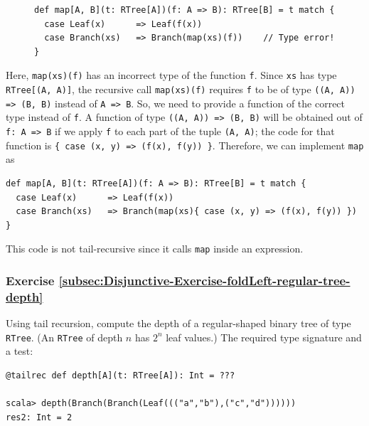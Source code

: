 \begin{figure}%
\vspace{-0.5\baselineskip}

\begin{lstlisting}
def map[A, B](t: RTree[A])(f: A => B): RTree[B] = t match {
  case Leaf(x)      => Leaf(f(x))
  case Branch(xs)   => Branch(map(xs)(f))    // Type error!
}
\end{lstlisting}
\vspace{-0.75\baselineskip}
\end{figure}%

\noindent Here, \lstinline!map(xs)(f)! has an incorrect type of the
function \lstinline!f!. Since \lstinline!xs! has type \lstinline!RTree[(A, A)]!,
the recursive call \lstinline!map(xs)(f)! requires \lstinline!f!
to be of type \lstinline!((A, A)) => (B, B)! instead of \lstinline!A => B!.
So, we need to provide a function of the correct type instead of \lstinline!f!.
A function of type \lstinline!((A, A)) => (B, B)! will be obtained
out of \lstinline!f: A => B! if we apply \lstinline!f! to each part
of the tuple \lstinline!(A, A)!; the code for that function is \lstinline!{ case (x, y) => (f(x), f(y)) }!.
Therefore, we can implement \lstinline!map! as
\begin{lstlisting}
def map[A, B](t: RTree[A])(f: A => B): RTree[B] = t match {
  case Leaf(x)      => Leaf(f(x))
  case Branch(xs)   => Branch(map(xs){ case (x, y) => (f(x), f(y)) })
}
\end{lstlisting}
This code is not tail-recursive since it calls \lstinline!map! inside
an expression.

\subsubsection{Exercise \label{subsec:Disjunctive-Exercise-foldLeft-regular-tree-depth}\ref{subsec:Disjunctive-Exercise-foldLeft-regular-tree-depth}}

Using tail recursion, compute the depth of a regular-shaped binary
tree of type \lstinline!RTree!. (An \lstinline!RTree! of depth $n$
has $2^{n}$ leaf values.) The required type signature and a test:
\begin{lstlisting}
@tailrec def depth[A](t: RTree[A]): Int = ???

scala> depth(Branch(Branch(Leaf((("a","b"),("c","d"))))))
res2: Int = 2
\end{lstlisting}

